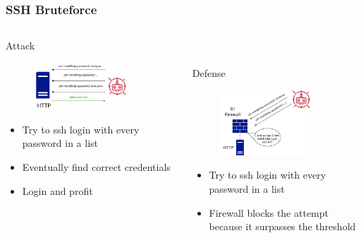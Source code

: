 \documentclass{beamer}
\begin{document}
\begin{frame}
\frametitle{SSH Bruteforce}
\begin{columns}
    \begin{column}{0.5\textwidth}
        \Large Attack
        \begin{figure}
            \centering
            \includegraphics[width=0.8\textwidth]{brute_attack.jpg}\\
        \end{figure}
            \begin{itemize}[label={}]
                \item \footnotesize Try to ssh login with every password in a list
                \item \footnotesize Eventually find correct credentials
                \item \footnotesize Login and profit
            \end{itemize}
    \end{column}
    \begin{column}{0.5\textwidth}
        \\~\\
        \Large Defense
        \begin{figure}
            \centering
            \includegraphics[width=0.8\textwidth]{brute_defense.jpg}\\
        \end{figure}
            \begin{itemize}[label={}]
                \item \footnotesize Try to ssh login with every password in a list
                \item \footnotesize Firewall blocks the attempt because it surpasses the threshold
            \end{itemize}
    \end{column}
\end{columns}
\end{frame}
\end{document}
